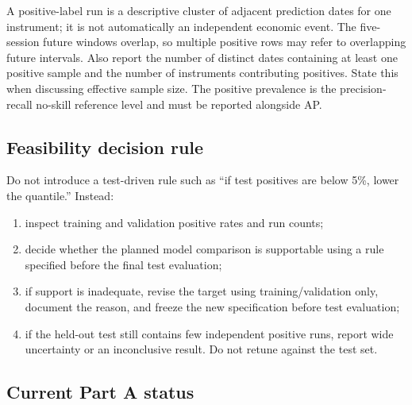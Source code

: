 \documentclass[11pt,a4paper]{article}
\begin{document}
A positive-label run is a descriptive cluster of adjacent prediction dates for one instrument; it is not automatically an independent economic event. The five-session future windows overlap, so multiple positive rows may refer to overlapping future intervals. Also report the number of distinct dates containing at least one positive sample and the number of instruments contributing positives. State this when discussing effective sample size. The positive prevalence is the precision-recall no-skill reference level and must be reported alongside AP.

\subsection{Feasibility decision rule}

Do not introduce a test-driven rule such as ``if test positives are below 5\%, lower the quantile.'' Instead:
\begin{enumerate}
  \item inspect training and validation positive rates and run counts;
  \item decide whether the planned model comparison is supportable using a rule specified before the final test evaluation;
  \item if support is inadequate, revise the target using training/validation only, document the reason, and freeze the new specification before test evaluation;
  \item if the held-out test still contains few independent positive runs, report wide uncertainty or an inconclusive result. Do not retune against the test set.
\end{enumerate}

\subsection{Current Part A status}
\end{document}
